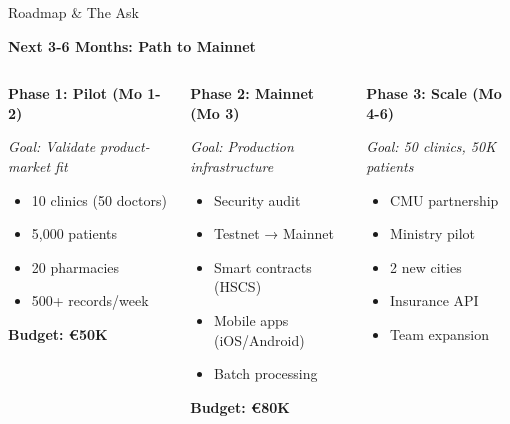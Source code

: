 \documentclass[aspectratio=169,xcolor=dvipsnames,20pt]{beamer}
\begin{document}
\begin{frame}{Roadmap \& The Ask}

  \textbf{\textcolor{FadjmaBlue}{Next 3-6 Months: Path to Mainnet}}

  \begin{columns}[T]
    \begin{column}{0.33\textwidth}
      \textbf{Phase 1: Pilot (Mo 1-2)}

      \textit{Goal: Validate product-market fit}

      \begin{itemize}
        \item 10 clinics (50 doctors)
        \item 5,000 patients
        \item 20 pharmacies
        \item 500+ records/week
      \end{itemize}

      \textbf{Budget: €50K}
    \end{column}

    \begin{column}{0.33\textwidth}
      \textbf{Phase 2: Mainnet (Mo 3)}

      \textit{Goal: Production infrastructure}

      \begin{itemize}
        \item Security audit
        \item Testnet → Mainnet
        \item Smart contracts (HSCS)
        \item Mobile apps (iOS/Android)
        \item Batch processing
      \end{itemize}

      \textbf{Budget: €80K}
    \end{column}

    \begin{column}{0.33\textwidth}
      \textbf{Phase 3: Scale (Mo 4-6)}

      \textit{Goal: 50 clinics, 50K patients}

      \begin{itemize}
        \item CMU partnership
        \item Ministry pilot
        \item 2 new cities
        \item Insurance API
        \item Team expansion
      \end{itemize}


\end{column}
\end{columns}
\end{frame}
\end{document}
